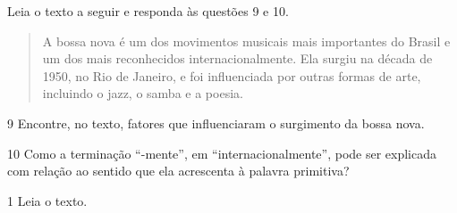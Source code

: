 
Leia o texto a seguir e responda às questões 9 e 10.

\begin{quote}
A bossa nova é um dos movimentos musicais mais importantes do Brasil e
um dos mais reconhecidos internacionalmente. Ela surgiu na década de
1950, no Rio de Janeiro, e foi influenciada por outras formas de arte,
incluindo o jazz, o samba e a poesia.

\end{quote}

\num{9} Encontre, no texto, fatores que influenciaram o surgimento da bossa nova.



\num{10} Como a terminação “-mente”, em “internacionalmente”, pode ser explicada com relação ao sentido que ela acrescenta à palavra primitiva?



\num{1} Leia o texto.\medskip


